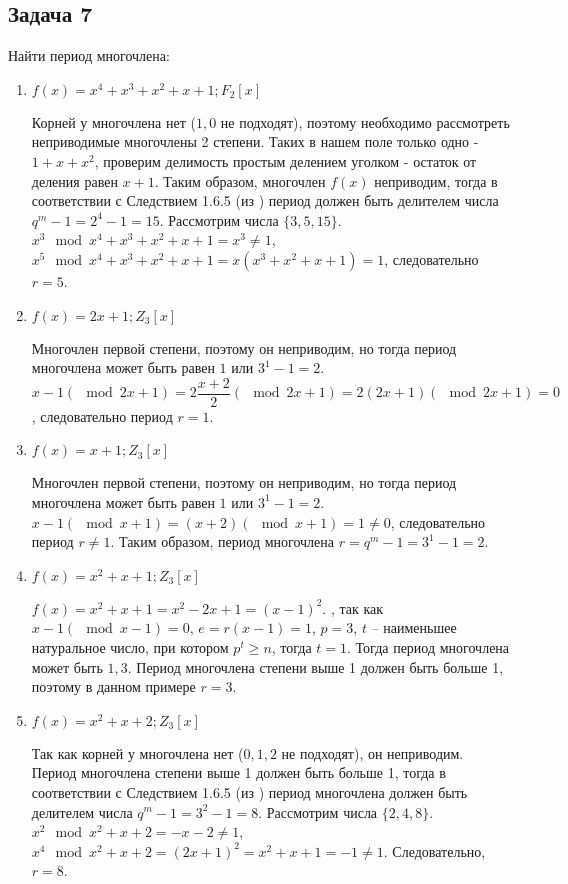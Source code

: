 \documentclass[utf8x, 14pt]{G7-32} %
\begin{document}
\subsection{Задача 7}
Найти период многочлена:
\begin{enumerate}
    \item $f(x)=x^4+x^3+x^2+x+1; F_2[x]$
    
    Корней у многочлена нет ($1,0$ не подходят), поэтому необходимо рассмотреть неприводимые многочлены 2 степени. Таких в нашем поле только одно - $1 + x + x^2$, проверим делимость простым делением уголком - остаток от деления равен $x+1$. Таким образом, многочлен $f(x)$ неприводим, тогда в соответствии с Следствием 1.6.5 (из \cite{hse:Teoria_Gener}) период должен быть делителем числа $ q^m -1 = 2^4 - 1 = 15$. Рассмотрим числа $\{3, 5, 15\}$. $x^3 \mod x^4+x^3+x^2+x+1 = x^3 \neq 1$, $x^5 \mod x^4+x^3+x^2+x+1 = x(x^3+x^2+x+1) = 1$, следовательно $r= 5$.

    \item $f(x)=2x+1; Z_3[x]$
    
    Многочлен первой степени, поэтому он неприводим, но тогда период многочлена может быть равен $1$ или $3^1-1 = 2$. $x -1 (\mod{2x + 1}) = 2\dfrac{x + 2}{2} (\mod{2x + 1}) = 2(2x + 1) (\mod{2x + 1}) = 0$, следовательно период $r = 1$.
    
    \item $f(x)=x+1; Z_3[x]$ \label{ex31}
    
    Многочлен первой степени, поэтому он неприводим, но тогда период многочлена может быть равен $1$ или $3^1-1 = 2$. $x - 1 (\mod{x + 1}) = (x + 2) (\mod{x + 1}) = 1 \neq 0$, следовательно период $r \neq 1$. Таким образом, период многочлена $r = q^m -1 = 3^1 -1 = 2$.
    
    \item $f(x)=x^2+x+1; Z_3[x]$
    
    $f(x) = x^2 + x + 1 = x^2 -2x +1 = (x - 1)^2$. , так как $x - 1 (\mod{x - 1}) = 0$, $e = r(x-1) = 1$, $p = 3$, $t$ – наименьшее натуральное число, при котором $p^t\geq n$, тогда $t = 1$. Тогда период многочлена может быть ${1, 3}$. Период многочлена степени выше 1 должен быть больше 1, поэтому в данном примере $r = 3$.

    \item $f(x)=x^2+x+2; Z_3[x]$ \label{ex3}
    
    Так как корней у многочлена нет ($0,1,2$ не подходят), он неприводим. Период многочлена степени выше 1 должен быть больше 1, тогда в соответствии с Следствием 1.6.5 (из \cite{hse:Teoria_Gener}) период многочлена должен быть делителем числа $q^m -1 = 3^2 -1 = 8$. Рассмотрим числа $\{2, 4, 8\}$. $x^2 \mod x^2 + x +2 = - x - 2 \neq 1$,  $x^4 \mod x^2 + x +2 = (2x + 1)^2 = x^2 + x + 1 = - 1 \neq 1$. Следовательно, $r=8$.


\end{enumerate}
\end{document}
